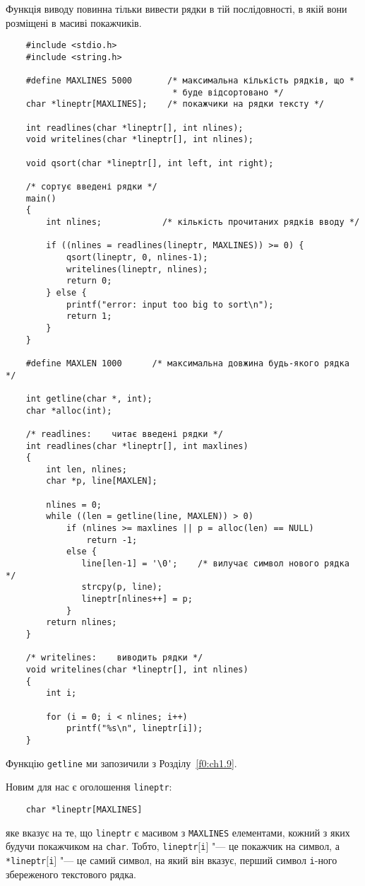 \documentclass[a4paper,12pt]{book}
\begin{document}
  Функція виводу повинна тільки вивести рядки в тій послідовності, в якій вони
  розміщені в масиві покажчиків.
  \begin{verbatim}
    #include <stdio.h>
    #include <string.h>

    #define MAXLINES 5000       /* максимальна кількість рядків, що *
                                 * буде відсортовано */
    char *lineptr[MAXLINES];    /* покажчики на рядки тексту */

    int readlines(char *lineptr[], int nlines);
    void writelines(char *lineptr[], int nlines);

    void qsort(char *lineptr[], int left, int right);

    /* сортує введені рядки */
    main()
    {
        int nlines;            /* кількість прочитаних рядків вводу */

        if ((nlines = readlines(lineptr, MAXLINES)) >= 0) {
            qsort(lineptr, 0, nlines-1);
            writelines(lineptr, nlines);
            return 0;
        } else {
            printf("error: input too big to sort\n");
            return 1;
        }
    }

    #define MAXLEN 1000      /* максимальна довжина будь-якого рядка */

    int getline(char *, int);
    char *alloc(int);

    /* readlines:    читає введені рядки */
    int readlines(char *lineptr[], int maxlines)
    {
        int len, nlines;
        char *p, line[MAXLEN];

        nlines = 0;
        while ((len = getline(line, MAXLEN)) > 0)
            if (nlines >= maxlines || p = alloc(len) == NULL)
                return -1;
            else {
               line[len-1] = '\0';    /* вилучає символ нового рядка */
               strcpy(p, line);
               lineptr[nlines++] = p;
            }
        return nlines;
    }

    /* writelines:    виводить рядки */
    void writelines(char *lineptr[], int nlines)
    {
        int i;

        for (i = 0; i < nlines; i++)
            printf("%s\n", lineptr[i]);
    }
  \end{verbatim}

  Функцію \texttt{getline} ми запозичили з Розділу~\ref{f0:ch1.9}.

  Новим для нас є оголошення \texttt{lineptr}:
  \begin{verbatim}
    char *lineptr[MAXLINES]
  \end{verbatim}
  яке вказує на те, що \texttt{lineptr} є масивом з \texttt{MAXLINES} елементами, кожний з
  яких будучи покажчиком на \texttt{char}. Тобто, \texttt{lineptr\mbox{$[$}i\mbox{$]$}}
  "--- це покажчик на символ, а \texttt{*lineptr\mbox{$[$}i\mbox{$]$}} "--- це самий
  символ, на який він вказує, перший символ \texttt{i}-ного збереженого текстового рядка.
  
\end{document}
